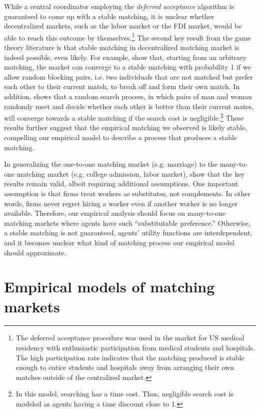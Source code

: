 While a central coordinator employing the \textit{deferred acceptance} algorithm
is guaranteed to come up with a stable matching, it is unclear whether
decentralized markets, such as the labor market or the FDI market, would be able
to reach this outcome by themselves.\footnote{The deferred acceptance procedure
  was used in the market for US medical residency with enthusiastic
  participation from medical students and hospitals. The high participation rate
  indicates that the matching produced is stable enough to entice students and
  hospitals away from arranging their own matches outside of the centralized
  market.} The second key result from the game theory literature is that stable
matching in decentralized matching market is indeed possible, even likely. For
example, \citet{Roth2016} show that, starting from an arbitrary matching, the
market can converge to a stable matching with probability 1 if we allow random
blocking pairs, i.e. two individuals that are not matched but prefer each other
to their current match, to break off and form their own match. In addition,
\citet{Adachi2003} shows that a random search process, in which pairs of man and
woman randomly meet and decide whether each other is better than their current
mates, will converge towards a stable matching if the search cost is
negligible.\footnote{In this model, searching has a time cost. Thus, negligible
  search cost is modeled as agents having a time discount close to 1.} These
results further suggest that the empirical matching we observed is likely
stable, compelling our empirical model to describe a process that produces a
stable matching.

In generalizing the one-to-one matching market (e.g. marriage) to the
many-to-one matching market (e.g. college admission, labor market),
\citet{Roth1992} show that the key results remain valid, albeit requiring
additional assumptions. One important assumption is that firms treat workers as
substitutes, not complements. In other words, firms never regret hiring a worker
even if another worker is no longer available. Therefore, our empirical analysis
should focus on many-to-one matching markets where agents have such
``substitutable preference.'' Otherwise, a stable matching is not guaranteed,
agents' utility functions are interdependent, and it becomes unclear what kind
of matching process our empirical model should approximate.

\section{Empirical models of matching markets}

